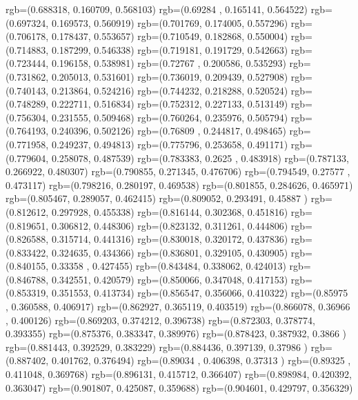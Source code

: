 {{{      rgb=(0.688318,  0.160709,  0.568103)
      rgb=(0.69284 ,  0.165141,  0.564522)
      rgb=(0.697324,  0.169573,  0.560919)
      rgb=(0.701769,  0.174005,  0.557296)
      rgb=(0.706178,  0.178437,  0.553657)
      rgb=(0.710549,  0.182868,  0.550004)
      rgb=(0.714883,  0.187299,  0.546338)
      rgb=(0.719181,  0.191729,  0.542663)
      rgb=(0.723444,  0.196158,  0.538981)
      rgb=(0.72767 ,  0.200586,  0.535293)
      rgb=(0.731862,  0.205013,  0.531601)
      rgb=(0.736019,  0.209439,  0.527908)
      rgb=(0.740143,  0.213864,  0.524216)
      rgb=(0.744232,  0.218288,  0.520524)
      rgb=(0.748289,  0.222711,  0.516834)
      rgb=(0.752312,  0.227133,  0.513149)
      rgb=(0.756304,  0.231555,  0.509468)
      rgb=(0.760264,  0.235976,  0.505794)
      rgb=(0.764193,  0.240396,  0.502126)
      rgb=(0.76809 ,  0.244817,  0.498465)
      rgb=(0.771958,  0.249237,  0.494813)
      rgb=(0.775796,  0.253658,  0.491171)
      rgb=(0.779604,  0.258078,  0.487539)
      rgb=(0.783383,  0.2625  ,  0.483918)
      rgb=(0.787133,  0.266922,  0.480307)
      rgb=(0.790855,  0.271345,  0.476706)
      rgb=(0.794549,  0.27577 ,  0.473117)
      rgb=(0.798216,  0.280197,  0.469538)
      rgb=(0.801855,  0.284626,  0.465971)
      rgb=(0.805467,  0.289057,  0.462415)
      rgb=(0.809052,  0.293491,  0.45887 )
      rgb=(0.812612,  0.297928,  0.455338)
      rgb=(0.816144,  0.302368,  0.451816)
      rgb=(0.819651,  0.306812,  0.448306)
      rgb=(0.823132,  0.311261,  0.444806)
      rgb=(0.826588,  0.315714,  0.441316)
      rgb=(0.830018,  0.320172,  0.437836)
      rgb=(0.833422,  0.324635,  0.434366)
      rgb=(0.836801,  0.329105,  0.430905)
      rgb=(0.840155,  0.33358 ,  0.427455)
      rgb=(0.843484,  0.338062,  0.424013)
      rgb=(0.846788,  0.342551,  0.420579)
      rgb=(0.850066,  0.347048,  0.417153)
      rgb=(0.853319,  0.351553,  0.413734)
      rgb=(0.856547,  0.356066,  0.410322)
      rgb=(0.85975 ,  0.360588,  0.406917)
      rgb=(0.862927,  0.365119,  0.403519)
      rgb=(0.866078,  0.36966 ,  0.400126)
      rgb=(0.869203,  0.374212,  0.396738)
      rgb=(0.872303,  0.378774,  0.393355)
      rgb=(0.875376,  0.383347,  0.389976)
      rgb=(0.878423,  0.387932,  0.3866  )
      rgb=(0.881443,  0.392529,  0.383229)
      rgb=(0.884436,  0.397139,  0.37986 )
      rgb=(0.887402,  0.401762,  0.376494)
      rgb=(0.89034 ,  0.406398,  0.37313 )
      rgb=(0.89325 ,  0.411048,  0.369768)
      rgb=(0.896131,  0.415712,  0.366407)
      rgb=(0.898984,  0.420392,  0.363047)
      rgb=(0.901807,  0.425087,  0.359688)
      rgb=(0.904601,  0.429797,  0.356329)
}}}
